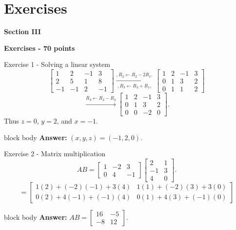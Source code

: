 \documentclass[aspectratio=169]{beamer}
\newcommand{\sectioncard}[2]{%
  \begin{frame}[plain]
    \vfill\centering
    {\Huge\color{lectureorange}\bfseries #1}\par\bigskip
    {\LARGE\color{lecturegreen}\bfseries #2}
    \vfill
  \end{frame}}
\newcommand{\answerbox}[1]{%
  \begin{beamercolorbox}[sep=1.0ex,wd=\linewidth]{block body}
    \textbf{Answer:} #1
  \end{beamercolorbox}}
\begin{document}
\section{Exercises}
\sectioncard{Section III}{Exercises - 70 points}

\begin{frame}{Exercise 1 - Solving a linear system}
\small
\[
\left[\begin{array}{ccc|c}
1&2&-1&3\\
2&5&1&8\\
-1&-1&2&-1
\end{array}\right]
\xrightarrow[,R_3\leftarrow R_3+R_1,]{,R_2\leftarrow R_2-2R_1,}
\left[\begin{array}{ccc|c}
1&2&-1&3\\
0&1&3&2\\
0&1&1&2
\end{array}\right]
\]
\[
\xrightarrow{R_3\leftarrow R_3-R_2}
\left[\begin{array}{ccc|c}
1&2&-1&3\\
0&1&3&2\\
0&0&-2&0
\end{array}\right].
\]
Thus $z=0$, $y=2$, and $x=-1$.
\answerbox{$\boxed{(x,y,z)=(-1,2,0)}$.}
\end{frame}

\begin{frame}{Exercise 2 - Matrix multiplication}
\small
\[
AB=
\begin{bmatrix}1&-2&3\\0&4&-1\end{bmatrix}
\begin{bmatrix}2&1\\-1&3\\4&0\end{bmatrix}.
\]
\[
=\begin{bmatrix}
1(2)+(-2)(-1)+3(4)&1(1)+(-2)(3)+3(0)\\
0(2)+4(-1)+(-1)(4)&0(1)+4(3)+(-1)(0)
\end{bmatrix}
\]
\answerbox{$\displaystyle \boxed{AB=\begin{bmatrix}16&-5\\-8&12\end{bmatrix}}$.}
\end{frame}
\end{document}
